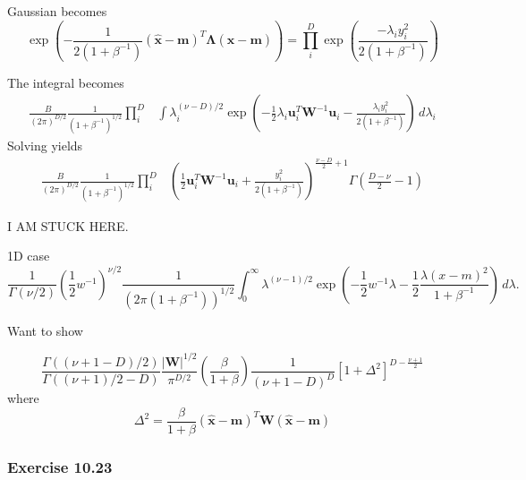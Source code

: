 \documentclass[12pt, a4paper]{article}
\newcommand{\vect}[1]{\bm{#1}}
\newcommand{\abs}[1]{\left\lvert#1\right\rvert}
\begin{document}
Gaussian becomes
\begin{equation*}
	\exp \left( 
	- \frac{1}{2 (1 + \beta^{-1})} ( \widehat{\vect{x}} - \vect{m} )^T
	\vect{\Lambda} 
	( \widehat{\vect{x}} - \vect{m} )  \right)
	=
	\prod_{i}^{D} \exp \left( 
	\frac{-\lambda_i y_i^2}{2 (1 + \beta^{-1})}  
	\right)
\end{equation*}

The integral becomes
\begin{align*}
\frac{B}{(2 \pi)^{D/2}}
\frac{1}{ (1 + \beta^{-1})^{1/2}}
\prod_i^D & \int   
\lambda_i^{(\nu - D)/2}
\exp \left( 
- \frac{1}{2} \lambda_i \vect{u}_i^T \vect{W}^{-1} \vect{u}_i
-\frac{\lambda_i y_i^2}{2 (1 + \beta^{-1})} 
 \right)
\, d \lambda_i
\end{align*}
Solving yields
\begin{align*}
\frac{B}{(2 \pi)^{D/2}}
\frac{1}{ (1 + \beta^{-1})^{1/2}}
\prod_i^D & 
\left( \frac{1}{2} \vect{u}_i^T \vect{W}^{-1} \vect{u}_i + 
\frac{ y_i^2}{2 (1 + \beta^{-1})} 
\right)^{\frac{\nu - D}{2} + 1}
\Gamma \left( \frac{D - \nu }{2} - 1 \right)
\end{align*}

I AM STUCK HERE.

1D case
\begin{equation}
\frac{1}{\Gamma(\nu/2)}
\left( \frac{1}{2} w^{-1} \right)^{\nu / 2}
\frac{1}{(2 \pi (1 + \beta^{-1}))^{1/2}}
\int_0^{\infty}
\lambda^{(\nu - 1)/2}
\exp\left( - \frac{1}{2} w^{-1} \lambda 
- \frac{1}{2} \frac{\lambda(x - m)^2 }{1 + \beta^{-1}}
\right)
\, d \lambda.
\end{equation}


Want to show

\begin{equation*}
	\frac{\Gamma((\nu + 1 - D)/2)}{\Gamma((\nu + 1)/2 - D)}
	\frac{\abs{\vect{W}}^{1/2}}{\pi^{D/2}}
	\left(\frac{\beta}{1 + \beta}\right) \frac{1}{(\nu + 1 - D)^D}
	\left[ 1 + \Delta^2 \right]^{D - \frac{\nu + 1}{2}}
\end{equation*}
where 
\begin{equation*}
	\Delta^2 = 
	\frac{\beta}{1 + \beta}
	( \widehat{\vect{x}} - \vect{m} )^T
	\vect{W}
	( \widehat{\vect{x}} - \vect{m} )
\end{equation*}




\subsubsection*{Exercise 10.23}
\end{document}
